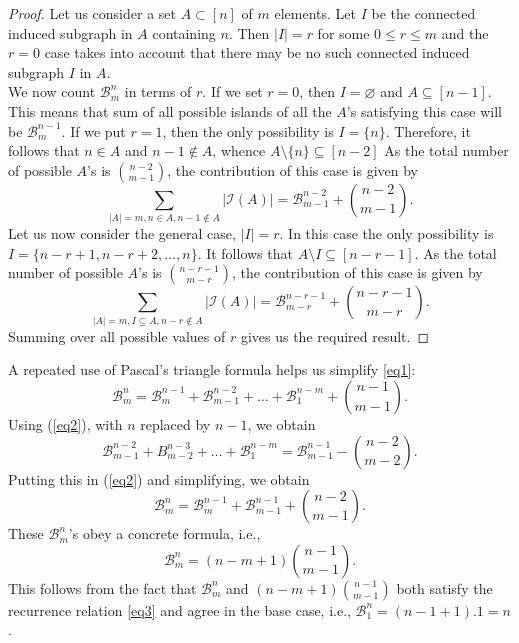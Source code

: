 \documentclass[10pt, reqno]{amsart}
\newcommand{\bgd}{\begin{displaymath}}
\newcommand{\edd}{\end{displaymath}}
\newcommand{\hf}{\hspace*{0.5cm}}
\theoremstyle{plain}
\theoremstyle{remark}
\def\B{\mathcal B}
\theoremstyle{definition}
\numberwithin{equation}{section}
\begin{document}
\begin{proof}
Let us consider a set $A\subset [n]$ of $m$ elements. Let $I$ be the connected induced subgraph in $A$ containing $n$. Then $|I|=r$ for some $0\leq r\leq m$ and the $r=0$ case takes into account that there may be no such connected induced subgraph $I$ in $A$. \\
\hf We now count $\mathcal{B}^n_m$ in terms of $r$. If we set $r=0$, then $I=\varnothing$ and $A\subseteq [n-1]$. This means that sum of all possible islands of all the $A$'s satisfying this case will be $\B^{n-1}_m$. If we put $r=1$, then the only possibility is $I=\{n\}$. Therefore, it follows that $n\in A$ and $n-1\notin A$, whence $A\setminus\{n\}\subseteq[n-2]$ 
As the total number of possible $A$'s is ${n-2 \choose m-1}$, the contribution of this case is given by	
	\bgd
	\sum_{|A|=m, n\in A, n-1\notin A}|\mathcal I(A)| =\B_{m-1}^{n-2}+{n-2 \choose m-1}.
	\edd
Let us now consider the general case, $|I|=r$. In this case the only possibility is $I=\{n-r+1, n-r+2, \dots ,n\}$. It follows that $A\setminus I\subseteq[n-r-1]$. As the total number of possible $A$'s is ${n-r-1 \choose m-r}$, the contribution of this case is given by	
	\bgd
	\sum_{|A|=m, I\subseteq A, n-r\notin A}|\mathcal I(A)| = \B_{m-r}^{n-r-1}+{n-r-1 \choose m-r}.
	\edd
Summing over all possible values of $r$ gives us the required result.
\end{proof}
A repeated use of Pascal's triangle formula helps us simplify \eqref{eq1}:
\begin{equation}
\B_m^n=\B_m^{n-1} +\B_{m-1}^{n-2} + \dots + \B_1^{n-m} + {n-1 \choose m-1}.\label{eq2}
\end{equation}
Using (\ref{eq2}), with $n$ replaced by $n-1$, we obtain
$$\B^{n-2}_{m-1} + B^{n-3}_{m-2} + \dots + \B^{n-m}_1 = \B^{n-1}_{m-1} - {n-2 \choose m-2}.$$
Putting this in (\ref{eq2}) and simplifying, we obtain
\begin{equation}
\B^n_m = \B^{n-1}_m + \B^{n-1}_{m-1} + {n-2 \choose m-1}.
\label{eq3}
\end{equation}
These $\mathcal{B}^n_m$'s obey a concrete formula, i.e., 
\begin{equation}
\B^n_m = (n-m+1){n-1 \choose m-1}.
\label{eq4}
\end{equation}
This follows from the fact that $\B^n_m$ and $(n-m+1){n-1 \choose m-1}$ both satisfy the recurrence relation \eqref{eq3} and agree in the base case, i.e., $\B^n_1=(n-1+1).1=n$.\\
\end{document}
